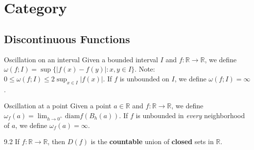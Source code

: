 
\chapter{Category}

\section{Discontinuous Functions}

\begin{definition}{Oscillation on an interval}
    Given a bounded interval $I$ and $f: \mathbb{R} \rightarrow \mathbb{R}$, we define $\omega(f; I) = \sup\{\lvert f(x) - f(y) \rvert: x, y \in I\}$.
    Note: $0 \leq \omega(f; I) \leq 2 \sup_{x \in I} \lvert f(x) \rvert$.
    If $f$ is unbounded on $I$, we define $\omega(f; I) = \infty$.
\end{definition}

\begin{definition}{Oscillation at a point}
    Given a point $a \in \mathbb{R}$ and $f: \mathbb{R} \rightarrow \mathbb{R}$, we define $\omega_f(a) = \lim_{h \rightarrow 0^+} \text{diam} f(B_h(a))$.
    If $f$ is unbounded in \textit{every} neighborhood of $a$, we define $\omega_f(a) = \infty$.
\end{definition}

\begin{theorem}{9.2}
    If $f: \mathbb{R} \rightarrow \mathbb{R}$, then $D(f)$ is the \textbf{countable} union of \textbf{closed} sets in $\mathbb{R}$.
\end{theorem}